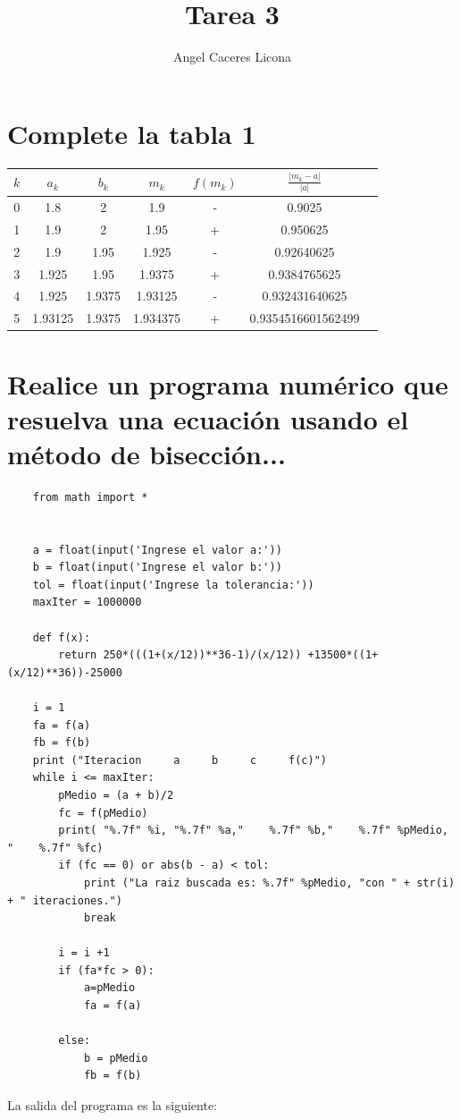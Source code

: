 \documentclass{article}
\begin{document}
\title{Tarea 3}
\author{Angel Caceres Licona}

\maketitle


\section{Complete la tabla 1}

\begin{center}
    \begin{tabular}{||c c c c c c c||} 
    \hline
    $k$ & $a_k$ & $b_k$ & $m_k$ & $f(m_k)$ & $\frac{|m_k - a|}{|a|}$ \\ [0.5ex] 
    \hline\hline
    0 & 1.8 & 2 & 1.9 & - & 0.9025 \\ 
    \hline
    1 & 1.9 & 2 & 1.95 & + & 0.950625 \\
    \hline
    2 & 1.9 & 1.95 & 1.925 & - & 0.92640625\\
    \hline
    3 & 1.925 & 1.95 & 1.9375 & + & 0.9384765625\\
    \hline
    4 & 1.925 & 1.9375 & 1.93125 & - & 0.932431640625\\
    \hline 
    5 & 1.93125 & 1.9375 & 1.934375 & + & 0.9354516601562499\\ 
    \hline 
   \end{tabular}
\end{center}

\section{Realice un programa numérico que resuelva una ecuación usando el método de bisección...}

\begin{lstlisting}
    from math import *
 

    a = float(input('Ingrese el valor a:'))
    b = float(input('Ingrese el valor b:'))
    tol = float(input('Ingrese la tolerancia:'))
    maxIter = 1000000
     
    def f(x):
        return 250*(((1+(x/12))**36-1)/(x/12)) +13500*((1+(x/12)**36))-25000
     
    i = 1
    fa = f(a)
    fb = f(b)
    print ("Iteracion     a     b     c     f(c)")
    while i <= maxIter:
        pMedio = (a + b)/2
        fc = f(pMedio)
        print( "%.7f" %i, "%.7f" %a,"    %.7f" %b,"    %.7f" %pMedio, "    %.7f" %fc)
        if (fc == 0) or abs(b - a) < tol:
            print ("La raiz buscada es: %.7f" %pMedio, "con " + str(i) + " iteraciones.")
            break
        
        i = i +1
        if (fa*fc > 0):
            a=pMedio
            fa = f(a)
    
        else:
            b = pMedio
            fb = f(b)
\end{lstlisting}
La salida del programa es la siguiente: 
\end{document}
